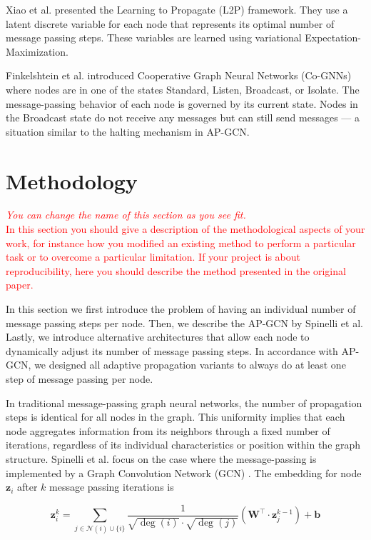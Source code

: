 \documentclass{gdl}
\begin{document}
Xiao et al. \cite{xiao2021} presented the Learning to Propagate (L2P) framework. They use a latent discrete variable for each node that represents its optimal number of message passing steps. These variables are learned using variational Expectation-Maximization.

Finkelshtein et al. \cite{finkelshtein2024} introduced Cooperative Graph Neural Networks (Co-GNNs) where nodes are in one of the states Standard, Listen, Broadcast, or Isolate. The message-passing behavior of each node is governed by its current state. Nodes in the Broadcast state do not receive any messages but can still send messages — a situation similar to the halting mechanism in AP-GCN.

\section{Methodology}

\textcolor{red}{
\textit{You can change the name of this section as you see fit.}\\
In this section you should give a description of the methodological aspects of your work, for instance how you modified an existing method to perform a particular task or to overcome a particular limitation. If your project is about reproducibility, here you should describe the method presented in the original paper.}

In this section we first introduce the problem of having an individual number of message passing steps per node. Then, we describe the AP-GCN by Spinelli et al. Lastly, we introduce alternative architectures that allow each node to dynamically adjust its number of message passing steps. In accordance with AP-GCN, we designed all adaptive propagation variants to always do at least one step of message passing per node.

In traditional message-passing graph neural networks, the number of propagation steps is identical for all nodes in the graph. This uniformity implies that each node aggregates information from its neighbors through a fixed number of iterations, regardless of its individual characteristics or position within the graph structure. Spinelli et al. focus on the case where the message-passing is implemented by a Graph Convolution Network (GCN) \cite{kipf2017}. The embedding for node $\mathbf{z}_i$ after $k$ message passing iterations is

$$
\mathbf{z}_i^{k} = \sum_{j \in \mathcal{N}(i) \cup \{i\}} \frac{1}{\sqrt{\deg(i)} \cdot \sqrt{\deg(j)}} \left( \mathbf{W}^\top \cdot \mathbf{z}_j^{k-1} \right) + \mathbf{b}
$$
\end{document}
